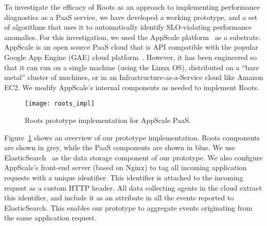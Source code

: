 To investigate the efficacy of Roots as an approach to
implementing performance diagnostics as a PaaS service, we have developed a
working prototype, and a set of algorithms that uses it to automatically
identify SLO-violating performance anomalies.
For this investigation, we used the AppScale
platform~\cite{6488671} as a substrate. AppScale is an open source PaaS cloud
that is API compatible
with the popular Google App Engine (GAE) cloud platform~\cite{gae}.  
However, it has been engineered so that it can run on a
single machine (using the Linux OS), distributed on a ``bare metal'' cluster
of machines, or in an Infrastructure-as-a-Service cloud like Amazon EC2.
We modify AppScale's internal components as needed to implement Roots.


\begin{figure}
\centering
\texttt{[image: roots\_impl]}
\caption{Roots prototype implementation for AppScale PaaS.}
\label{fig:roots_impl}
\end{figure}

Figure~\ref{fig:roots_impl} shows an overview of our prototype implementation. Roots components
are shown in grey, while the PaaS components are shown in blue.
We use ElasticSearch~\cite{elasticsearch} as the data storage component of our prototype. 
We also configure AppScale's front-end server (based on Nginx) to tag all incoming application requests
with a unique identifier. This identifier is attached to the incoming request as a custom HTTP header.
All data collecting agents in the cloud extract this identifier, and include it as an attribute
in all the events reported to ElasticSearch. This enables our prototype to aggregate events originating
from the same application request.

